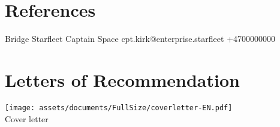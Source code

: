 \section{References}

    {
        {Bridge}%
        {Starfleet}%
        {Captain}%
        {Space}%
        {}%
        {cpt.kirk@enterprise.starfleet}%
        {}%
        {+4700000000}%
        {}
    }
\section{Letters of Recommendation}
    \begin{minipage}{\linewidth}
        \centering
        \texttt{[image: assets/documents/FullSize/coverletter-EN.pdf]} \\
        Cover letter
        \label{ref:cl}
    \end{minipage}

